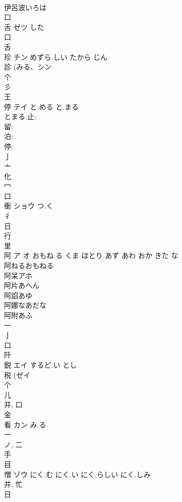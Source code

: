 \documentclass[8pt]{extreport}
\begin{document}
\begin{CJK}{UTF8}{min}
\\	伊呂波いろは
\\	口 
\\	舌	ゼツ	した	
\\	口 
\\	舌 
\\	珍	チン	めずら.しい たから じん	
\\	診 (みる、シン 
\\	个 
\\	彡 
\\	王 
\\	停	テイ	と.める と.まる	
\\	とまる:止: 
\\	留: 
\\	泊: 
\\	停: 
\\	亅 
\\	亠 
\\	化 
\\	冖 
\\	口 
\\	衝	ショウ	つ.く	
\\	彳 
\\	日 
\\	行 
\\	里 
\\	阿	ア オ	おもね.る くま ほとり あず あわ おか きた な	
\\	阿ねるおもねる 
\\	阿呆アホ 
\\	阿片あへん 
\\	阿諂あゆ 
\\	阿娜なあだな 
\\	阿附あふ 
\\	一 
\\	亅 
\\	口 
\\	阡	
\\	鋭	エイ	するど.い とし	
\\	税 (ゼイ 
\\	个 
\\	儿 
\\	并, 口 
\\	金 
\\	看	カン	み.る	
\\	一 
\\	ノ, 二 
\\	手 
\\	目 
\\	憎	ゾウ	にく.む にく.い にく.らしい にく.しみ	
\\	并, 忙 
\\	日 

\end{CJK}
\end{document}
